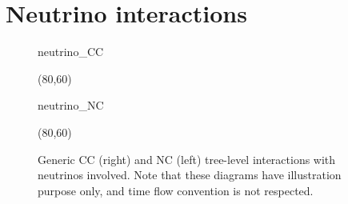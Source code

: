\section{Neutrino interactions}
\label{sec:neutrino_interactions}

\begin{figure}
	\centering
	\medskip
	\begin{fmffile}{neutrino_CC}
		\begin{fmfgraph*}(80,60)
		\end{fmfgraph*}
	\end{fmffile}
	\qquad
	\raisebox{2.5em}{,}
	\qquad
	\begin{fmffile}{neutrino_NC}
		\begin{fmfgraph*}(80,60)
		\end{fmfgraph*}
	\end{fmffile}
	\bigskip
	\caption[Generic CC and NC tree-level weak interactions]%
	{Generic CC (right) and NC (left) tree-level interactions with neutrinos involved.
	Note that these diagrams have illustration purpose only, and time flow convention is not respected. }
	\label{fig:neutrino_tree}
\end{figure}

